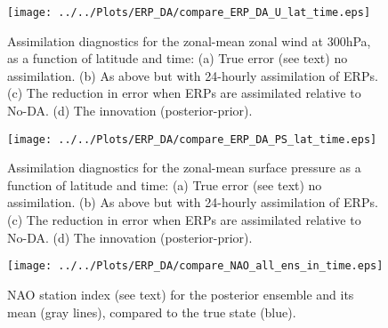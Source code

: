 \documentclass[draft,jgrga]{agutex}
\begin{document}
 \begin{figure}
\texttt{[image: ../../Plots/ERP\_DA/compare\_ERP\_DA\_U\_lat\_time.eps]} 
 \caption{Assimilation diagnostics for the zonal-mean zonal wind at 300hPa, as a function of latitude and time: (a) True error (see text)  no assimilation.  (b) As above but with 24-hourly assimilation of ERPs.  (c) The reduction in error when ERPs are assimilated relative to No-DA.  (d) The innovation (posterior-prior).}
 \label{fig:ERP_DA_U_lat_time}
\end{figure}

 \begin{figure}
\texttt{[image: ../../Plots/ERP\_DA/compare\_ERP\_DA\_PS\_lat\_time.eps]} 
 \caption{Assimilation diagnostics for the zonal-mean surface pressure as a function of latitude and time: (a) True error (see text)  no assimilation.  (b) As above but with 24-hourly assimilation of ERPs.  (c) The reduction in error when ERPs are assimilated relative to No-DA.  (d) The innovation (posterior-prior).}
 \label{fig:ERP_DA_PS_lat_time}
\end{figure}

 \begin{figure}
\texttt{[image: ../../Plots/ERP\_DA/compare\_NAO\_all\_ens\_in\_time.eps]} 
 \caption{NAO station index (see text) for the posterior ensemble and its mean (gray lines), compared to the true state (blue).}
 \label{fig:NAO}
\end{figure}


%
%
%
%
%

\end{document}
